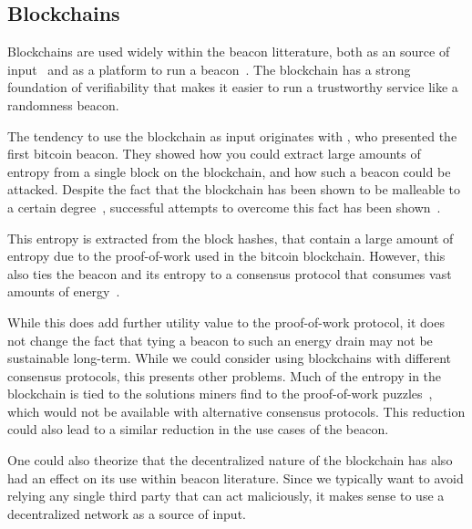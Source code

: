 \subsection{Blockchains}

Blockchains are used widely within the beacon litterature, both as an source of input~\cite{bonneau2015bitcoin, bentov2016bitcoin, bunz2017proofsof} and as a platform to run a beacon~\cite{randao, bunz2017proofsof}.
The blockchain has a strong foundation of verifiability that makes it easier to run a trustworthy service like a randomness beacon.

The tendency to use the blockchain as input originates with \citet{bonneau2015bitcoin}, who presented the first bitcoin beacon.
They showed how you could extract large amounts of entropy from a single block on the blockchain, and how such a beacon could be attacked.
Despite the fact that the blockchain has been shown to be malleable to a certain degree~\cite{pierrot2016malleability}, successful attempts to overcome this fact has been shown~\cite{bunz2017proofsof}.

This entropy is extracted from the block hashes, that contain a large amount of entropy due to the proof-of-work used in the bitcoin blockchain.
However, this also ties the beacon and its entropy to a consensus protocol that consumes vast amounts of energy~\cite{bitcoinenergy}.

While this does add further utility value to the proof-of-work protocol, it does not change the fact that tying a beacon to such an energy drain may not be sustainable long-term.
While we could consider using blockchains with different consensus protocols, this presents other problems.
Much of the entropy in the blockchain is tied to the solutions miners find to the proof-of-work puzzles~\cite{bonneau2015bitcoin}, which would not be available with alternative consensus protocols.
This reduction could also lead to a similar reduction in the use cases of the beacon.

One could also theorize that the decentralized nature of the blockchain has also had an effect on its use within beacon literature.
Since we typically want to avoid relying any single third party that can act maliciously, it makes sense to use a decentralized network as a source of input.

